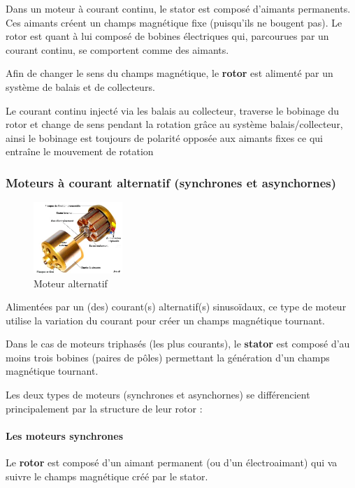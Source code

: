 \documentclass[10pt,fleqn]{article} %
\begin{document}
Dans un moteur à courant continu, le stator est composé d'aimants permanents. Ces aimants créent un champs magnétique fixe (puisqu'ils ne bougent pas).
Le rotor est quant à lui composé de bobines électriques qui, parcourues par un courant continu, se comportent comme des aimants.

Afin de changer le sens du champs magnétique, le \textbf{rotor} est alimenté par un système de balais et de collecteurs.

\begin{aretenir}
  Le courant continu injecté via les balais au collecteur, traverse le bobinage du rotor et change de sens pendant la rotation grâce au système balais/collecteur, ainsi le bobinage est toujours de polarité opposée aux aimants fixes ce qui entraîne le mouvement de rotation
\end{aretenir}

\subsubsection{Moteurs à courant alternatif (synchrones et asynchornes)}

\begin{figure}
  \centering
  \includegraphics[width=0.3\textwidth]{images/moteur11}
  \caption{Moteur alternatif}
  \label{fig:mot}
\end{figure}

Alimentées par un (des) courant(s) alternatif(s) sinusoïdaux, ce type de moteur utilise la variation du courant pour créer un champs magnétique tournant.

Dans le cas de moteurs triphasés (les plus courants), le \textbf{stator} est composé d'au moins trois bobines (paires de pôles) permettant la génération d'un champs magnétique tournant.

Les deux types de moteurs (synchrones et asynchornes) se différencient principalement par la structure de leur rotor :
\paragraph{Les moteurs synchrones}
Le \textbf{rotor} est composé d'un aimant permanent (ou d'un électroaimant) qui va suivre le champs magnétique créé par le stator.
\end{document}
